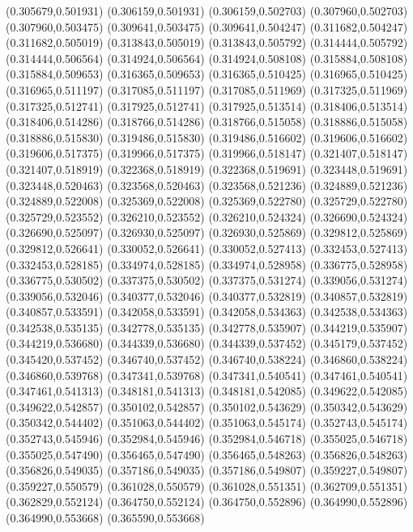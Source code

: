 (0.305679,0.501931)
(0.306159,0.501931)
(0.306159,0.502703)
(0.307960,0.502703)
(0.307960,0.503475)
(0.309641,0.503475)
(0.309641,0.504247)
(0.311682,0.504247)
(0.311682,0.505019)
(0.313843,0.505019)
(0.313843,0.505792)
(0.314444,0.505792)
(0.314444,0.506564)
(0.314924,0.506564)
(0.314924,0.508108)
(0.315884,0.508108)
(0.315884,0.509653)
(0.316365,0.509653)
(0.316365,0.510425)
(0.316965,0.510425)
(0.316965,0.511197)
(0.317085,0.511197)
(0.317085,0.511969)
(0.317325,0.511969)
(0.317325,0.512741)
(0.317925,0.512741)
(0.317925,0.513514)
(0.318406,0.513514)
(0.318406,0.514286)
(0.318766,0.514286)
(0.318766,0.515058)
(0.318886,0.515058)
(0.318886,0.515830)
(0.319486,0.515830)
(0.319486,0.516602)
(0.319606,0.516602)
(0.319606,0.517375)
(0.319966,0.517375)
(0.319966,0.518147)
(0.321407,0.518147)
(0.321407,0.518919)
(0.322368,0.518919)
(0.322368,0.519691)
(0.323448,0.519691)
(0.323448,0.520463)
(0.323568,0.520463)
(0.323568,0.521236)
(0.324889,0.521236)
(0.324889,0.522008)
(0.325369,0.522008)
(0.325369,0.522780)
(0.325729,0.522780)
(0.325729,0.523552)
(0.326210,0.523552)
(0.326210,0.524324)
(0.326690,0.524324)
(0.326690,0.525097)
(0.326930,0.525097)
(0.326930,0.525869)
(0.329812,0.525869)
(0.329812,0.526641)
(0.330052,0.526641)
(0.330052,0.527413)
(0.332453,0.527413)
(0.332453,0.528185)
(0.334974,0.528185)
(0.334974,0.528958)
(0.336775,0.528958)
(0.336775,0.530502)
(0.337375,0.530502)
(0.337375,0.531274)
(0.339056,0.531274)
(0.339056,0.532046)
(0.340377,0.532046)
(0.340377,0.532819)
(0.340857,0.532819)
(0.340857,0.533591)
(0.342058,0.533591)
(0.342058,0.534363)
(0.342538,0.534363)
(0.342538,0.535135)
(0.342778,0.535135)
(0.342778,0.535907)
(0.344219,0.535907)
(0.344219,0.536680)
(0.344339,0.536680)
(0.344339,0.537452)
(0.345179,0.537452)
(0.345420,0.537452)
(0.346740,0.537452)
(0.346740,0.538224)
(0.346860,0.538224)
(0.346860,0.539768)
(0.347341,0.539768)
(0.347341,0.540541)
(0.347461,0.540541)
(0.347461,0.541313)
(0.348181,0.541313)
(0.348181,0.542085)
(0.349622,0.542085)
(0.349622,0.542857)
(0.350102,0.542857)
(0.350102,0.543629)
(0.350342,0.543629)
(0.350342,0.544402)
(0.351063,0.544402)
(0.351063,0.545174)
(0.352743,0.545174)
(0.352743,0.545946)
(0.352984,0.545946)
(0.352984,0.546718)
(0.355025,0.546718)
(0.355025,0.547490)
(0.356465,0.547490)
(0.356465,0.548263)
(0.356826,0.548263)
(0.356826,0.549035)
(0.357186,0.549035)
(0.357186,0.549807)
(0.359227,0.549807)
(0.359227,0.550579)
(0.361028,0.550579)
(0.361028,0.551351)
(0.362709,0.551351)
(0.362829,0.552124)
(0.364750,0.552124)
(0.364750,0.552896)
(0.364990,0.552896)
(0.364990,0.553668)
(0.365590,0.553668)
